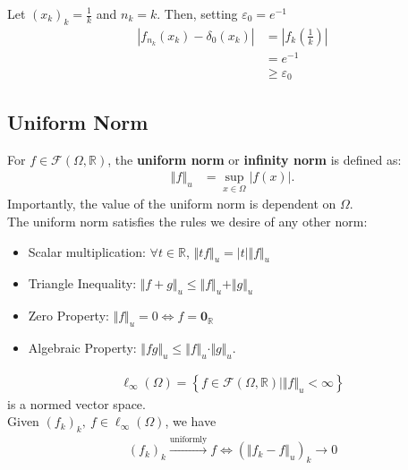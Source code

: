 \documentclass[10pt]{extarticle}
\renewcommand{\mathbf}[1]{\mathbold{#1}}
\newcommand{\R}{\mathbb{R}}
\begin{document}
    Let $(x_k)_k = \frac{1}{k}$ and $n_k = k$. Then, setting $\varepsilon_0 = e^{-1}$
    \begin{align*}
      \left|f_{n_k}(x_k) - \delta_0(x_k)\right| &= \left|f_k\left(\frac{1}{k}\right)\right|\\
                                                &= e^{-1}\\
                                                &\geq \varepsilon_0
    \end{align*}
  \subsection{Uniform Norm}%
    For $f\in \mathcal{F}(\Omega,\R)$, the \textbf{uniform norm} or \textbf{infinity norm} is defined as:
    \begin{align*}
      \left\Vert f \right\Vert_{u} &= \sup_{x\in\Omega}\left|f(x)\right|.
    \end{align*}
    Importantly, the value of the uniform norm is dependent on $\Omega$.\\

    The uniform norm satisfies the rules we desire of any other norm:
    \begin{itemize}
      \item Scalar multiplication: $\forall t\in\R$, $\Vert tf\Vert_u = |t|\Vert f \Vert_u$
      \item Triangle Inequality: $\Vert f + g \Vert_u \leq \Vert f \Vert_u + \Vert g \Vert_u$
      \item Zero Property: $\Vert f\Vert_u = 0 \Leftrightarrow f = \mathbf{0}_{\R}$
      \item Algebraic Property: $\Vert fg\Vert_u \leq \Vert f\Vert_u \cdot \Vert g \Vert_u$.
    \end{itemize}

    \begin{align*}
      \ell_{\infty}(\Omega) = \left\{f\in\mathcal{F}(\Omega,\R)\mid \Vert f \Vert_u < \infty\right\}
    \end{align*}
    is a normed vector space.\\
    
    Given $(f_k)_k,~f \in \ell_{\infty}(\Omega)$, we have
    \begin{align*}
      (f_k)_k \xrightarrow{\text{uniformly}} f \Leftrightarrow \left(\Vert f_k - f \Vert_u\right)_k \rightarrow 0
    \end{align*}
\end{document}
